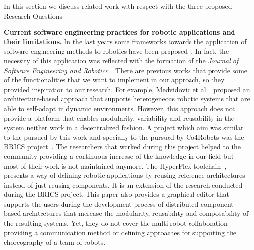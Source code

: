 In this section we discuss related work with respect with the three proposed Research Questions.

\textbf{Current software engineering practices for robotic applications and their limitations.}
In the last years some frameworks towards the application of software engineering methods to robotics have been proposed~\cite{Ramaswamy2014}.
In fact, the necessity of this application was reflected with the formation of the \emph{Journal of Software Engineering and Robotics}~\cite{Brugali2010_journal}.
There are previous works that provide some of the functionalities that we want to implement in our approach, so they provided inspiration to our research.
For example, Medvidovic et al.~\cite{medvidovic} proposed an architecture-based approach that supports heterogeneous robotic systems that are able to self-adapt in dynamic environments.
However, this approach does not provide a platform that enables modularity, variability and reusability in the system neither work in a decentralized fashion.
A project which aim was similar to the pursued by this work and specially to the pursued by Co4Robots was the BRICS project~\cite{Bischoff2010}. 
The researchers that worked during this project helped to the community providing a continuous increase of the knowledge in our field but most of their work is not maintained anymore.
The HyperFlex toolchain~\cite{gherardi}, presents a way of defining robotic applications by reusing reference architectures instead of just reusing components.
It is an extension of the research conducted during the BRICS project.
This paper also provides a graphical editor that supports the users during the development process of distributed component-based architectures that increase the modularity, reusability and composability of the resulting systems.
Yet, they do not cover the multi-robot collaboration providing a communication method or defining approaches for supporting the choreography of a team of robots.

